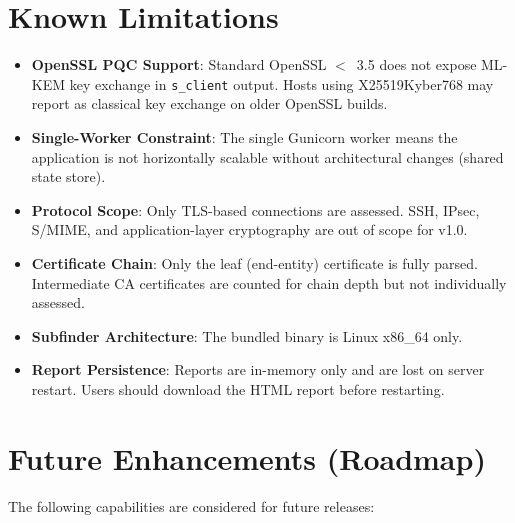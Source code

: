 \section{Known Limitations}
\label{sec:limitations}

\begin{itemize}[noitemsep]
  \item \textbf{OpenSSL PQC Support}: Standard OpenSSL $<$~3.5 does not expose
        ML-KEM key exchange in \texttt{s\_client} output. Hosts using
        X25519Kyber768 may report as classical key exchange on older OpenSSL
        builds.
  \item \textbf{Single-Worker Constraint}: The single Gunicorn worker means the
        application is not horizontally scalable without architectural changes
        (shared state store).
  \item \textbf{Protocol Scope}: Only TLS-based connections are assessed.
        SSH, IPsec, S/MIME, and application-layer cryptography are out of scope
        for v1.0.
  \item \textbf{Certificate Chain}: Only the leaf (end-entity) certificate is
        fully parsed. Intermediate CA certificates are counted for chain depth
        but not individually assessed.
  \item \textbf{Subfinder Architecture}: The bundled binary is Linux x86\_64 only.
  \item \textbf{Report Persistence}: Reports are in-memory only and are lost on
        server restart. Users should download the HTML report before restarting.
\end{itemize}

\section{Future Enhancements (Roadmap)}
\label{sec:roadmap}

The following capabilities are considered for future releases:

